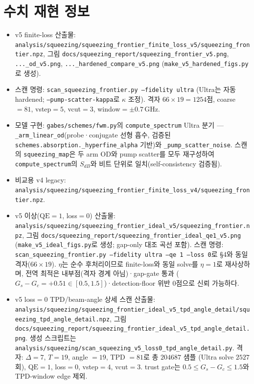 \documentclass[11pt,a4paper]{article}
\newcommand{\GHz}{\,\mathrm{GHz}}
\begin{document}
\section{수치 재현 정보}
\begin{itemize}[nosep]
\item v5 finite-loss 산출물:
      \texttt{analysis/squeezing/squeezing\_frontier\_finite\_loss\_v5/squeezing\_frontier.npz},
      그림 \texttt{docs/squeezing\_report/squeezing\_frontier\_v5.png},
      \texttt{...\_od\_v5.png}, \texttt{...\_hardened\_compare\_v5.png}
      (\texttt{make\_v5\_hardened\_figs.py}로 생성).
\item 스캔 명령: \texttt{scan\_squeezing\_frontier.py --fidelity ultra}
      (Ultra는 자동 hardened; \texttt{--pump-scatter-kappa}로 $\kappa$ 조정).
      격자 $66\times19=1254$점, coarse$=81$, vstep$=5$, vcut$=3$, window$=\pm0.7\GHz$.
\item 모델 구현: \texttt{gabes/schemes/fwm.py}의 \texttt{compute\_spectrum} Ultra
      분기 --- \texttt{\_arm\_linear\_od}(probe·conjugate 선형 흡수, 검증된
      \texttt{schemes.absorption.\_hyperfine\_alpha} 기반)와
      \texttt{\_pump\_scatter\_noise}. 스캔의 \texttt{squeezing\_map}은 두 arm OD와
      pump scatter를 모두 재구성하여 \texttt{compute\_spectrum}의 $S_{dB}$와
      비트 단위로 일치(self-consistency 검증됨).
\item 비교용 v4 legacy:
      \texttt{analysis/squeezing/squeezing\_frontier\_finite\_loss\_v4/squeezing\_frontier.npz}.
\item v5 이상($\mathrm{QE}=1$, loss$=0$) 산출물:
      \texttt{analysis/squeezing/squeezing\_frontier\_ideal\_v5/squeezing\_frontier.npz}, 그림
      \texttt{docs/squeezing\_report/squeezing\_frontier\_ideal\_qe1\_v5.png}
      (\texttt{make\_v5\_ideal\_figs.py}로 생성; gap-only 대조 곡선 포함). 스캔 명령:
      \texttt{scan\_squeezing\_frontier.py --fidelity ultra --qe 1 --loss 0}로 \S4와
      동일 격자($66\times19$). $\eta$는 순수 후처리이므로 finite-loss와 동일 solve를
      $\eta=1$로 재사상하며, 전역 최적은 내부점(격자 경계 아님)·gap-gate 통과
      ($G_s-G_c=+0.51\in[0.5,1.5]$)·detection-floor 위반 $0$점으로 신뢰 가능하다.
\item v5 loss$=0$ TPD/beam-angle 상세 스캔 산출물:
      \texttt{analysis/squeezing/squeezing\_frontier\_ideal\_v5\_tpd\_angle\_detail/squeezing\_tpd\_angle\_detail.npz},
      그림 \texttt{docs/squeezing\_report/squeezing\_frontier\_ideal\_v5\_tpd\_angle\_detail.png}.
      생성 스크립트는 \texttt{analysis/squeezing/scan\_squeezing\_v5\_loss0\_tpd\_angle\_detail.py}.
      격자: $\Delta=7$, $T=19$, angle $=19$, TPD $=81$로 총 $204687$ 샘플
      (Ultra solve $2527$회), $\mathrm{QE}=1$, loss$=0$, vstep$=4$, vcut$=3$.
      trust gate는 $0.5\le G_s-G_c\le1.5$와 TPD-window edge 제외.
\end{itemize}
\end{document}
